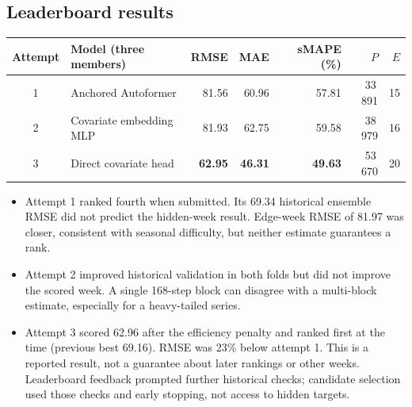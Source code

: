\subsection{Leaderboard results}
\begin{center}\small
\begin{tabular}{clrrrrr}
\toprule
Attempt & Model (three members) & RMSE & MAE & sMAPE (\%) & $P$ & $E$\\
\midrule
1 & Anchored Autoformer     & 81.56 & 60.96 & 57.81 & 33\,891 & 15\\
2 & Covariate embedding MLP & 81.93 & 62.75 & 59.58 & 38\,979 & 16\\
3 & Direct covariate head   & \textbf{62.95} & \textbf{46.31} & \textbf{49.63} & 53\,670 & 20\\
\bottomrule
\end{tabular}
\end{center}
\begin{itemize}
  \item Attempt 1 ranked fourth when submitted. Its 69.34 historical ensemble RMSE
        did not predict the hidden-week result. Edge-week RMSE of 81.97 was closer,
        consistent with seasonal difficulty, but neither estimate guarantees a rank.
  \item Attempt 2 improved historical validation in both folds but did not improve
        the scored week. A single 168-step block can disagree with a multi-block
        estimate, especially for a heavy-tailed series.
  \item Attempt 3 scored 62.96 after the efficiency penalty and ranked first at the
        time (previous best 69.16). RMSE was 23\% below attempt 1. This is a reported
        result, not a guarantee about later rankings or other weeks. Leaderboard
        feedback prompted further historical checks; candidate selection used those
        checks and early stopping, not access to hidden targets.
\end{itemize}

